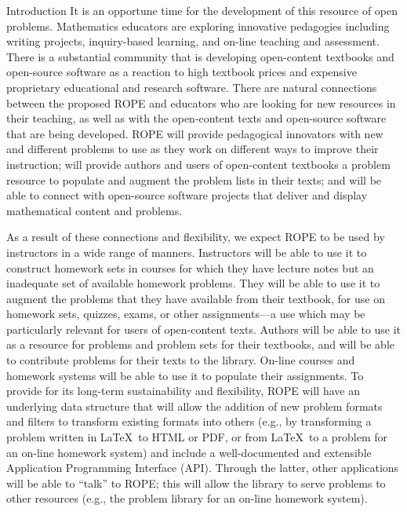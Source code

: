 \documentclass[11pt]{article}
\begin{document}
\begin{section}{Introduction}
It is an opportune time for the development of this resource of open problems.  Mathematics educators are exploring innovative pedagogies
including writing projects, inquiry-based learning, and on-line teaching
and assessment.  There is a substantial community that is developing
open-content textbooks and open-source software as a reaction to high
textbook prices and expensive proprietary educational and research
software.  There are natural connections between the proposed ROPE and
educators who are looking for new resources in their teaching, as well as
with the open-content texts and open-source software that are being
developed.  ROPE will provide pedagogical innovators with new and
different problems to use as they work on different ways to improve their
instruction; will provide authors and users of open-content textbooks a
problem resource to populate and augment the problem lists in their texts;
and will be able to connect with open-source software projects that
deliver and display mathematical content and problems.

As a result of these connections and flexibility, we expect ROPE to be
used by instructors in a wide range of manners.  Instructors will be able
to use it to construct homework sets in courses for which they have
lecture notes but an inadequate set of available homework problems.  They
will be able to use it to augment the problems that they have available
from their textbook, for use on homework sets, quizzes, exams, or other
assignments---a use which may be particularly relevant for users of
open-content texts.  Authors will be able to use it as a resource for
problems and problem sets for their textbooks, and will be able to
contribute problems for their texts to the library.  On-line courses and
homework systems will be able to use it to populate their assignments.  To
provide for its long-term sustainability and flexibility, ROPE will
have an underlying data structure that will allow the addition of new
problem formats and filters to transform existing formats into others
(e.g., by transforming a problem written in \LaTeX\ to HTML or PDF, or
from \LaTeX\ to a problem for an on-line homework system) and include a
well-documented and extensible Application Programming Interface
(API). Through the latter, other applications will be able to ``talk'' to
ROPE; this will allow the library to serve problems to other resources
(e.g., the problem library for an on-line homework system).

\end{section}
\end{document}
